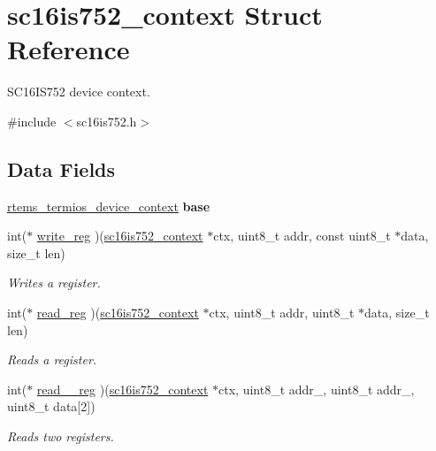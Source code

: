 \hypertarget{structsc16is752__context}{}\section{sc16is752\+\_\+context Struct Reference}
\label{structsc16is752__context}


S\+C16\+I\+S752 device context.  




{\ttfamily \#include $<$sc16is752.\+h$>$}

\subsection*{Data Fields}
\begin{DoxyCompactItemize}
\item 
\mbox{\label{structsc16is752__context_a98ee7de7d5536508bd6d33a25d617571}} 
\mbox{\hyperlink{structrtems__termios__device__context}{rtems\+\_\+termios\+\_\+device\+\_\+context}} {\bfseries base}
\item 
int($\ast$ \mbox{\hyperlink{structsc16is752__context_a919565fc80951588835d47031c70ceb3}{write\+\_\+reg}} )(\mbox{\hyperlink{structsc16is752__context}{sc16is752\+\_\+context}} $\ast$ctx, uint8\+\_\+t addr, const uint8\+\_\+t $\ast$data, size\+\_\+t len)
\begin{DoxyCompactList}\small\item\em Writes a register. \end{DoxyCompactList}\item 
int($\ast$ \mbox{\hyperlink{structsc16is752__context_aa0f05147040b5c016ebdc5779a52b97d}{read\+\_\+reg}} )(\mbox{\hyperlink{structsc16is752__context}{sc16is752\+\_\+context}} $\ast$ctx, uint8\+\_\+t addr, uint8\+\_\+t $\ast$data, size\+\_\+t len)
\begin{DoxyCompactList}\small\item\em Reads a register. \end{DoxyCompactList}\item 
int($\ast$ \mbox{\hyperlink{structsc16is752__context_a97f6562fd545b007bb81264b54e06e5e}{read\+\_\+\_\+reg}} )(\mbox{\hyperlink{structsc16is752__context}{sc16is752\+\_\+context}} $\ast$ctx, uint8\+\_\+t addr\+\_, uint8\+\_\+t addr\+\_, uint8\+\_\+t data\mbox{[}2\mbox{]})
\begin{DoxyCompactList}\small\item\em Reads two registers. \end{DoxyCompactList}\item 

\end{DoxyCompactItemize}
